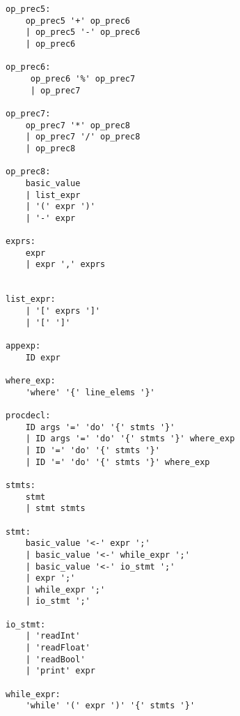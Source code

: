 \documentclass[11pt]{article}
\begin{document}
\begin{lstlisting}[basicstyle=\small]
op_prec5:
    op_prec5 '+' op_prec6
    | op_prec5 '-' op_prec6
    | op_prec6

op_prec6:
     op_prec6 '%' op_prec7
     | op_prec7

op_prec7:
    op_prec7 '*' op_prec8
    | op_prec7 '/' op_prec8
    | op_prec8

op_prec8:
    basic_value
    | list_expr
    | '(' expr ')'
    | '-' expr

exprs:
    expr
    | expr ',' exprs


list_expr:
    | '[' exprs ']'
    | '[' ']'

appexp:
    ID expr

where_exp:
    'where' '{' line_elems '}' 

procdecl:
    ID args '=' 'do' '{' stmts '}'
    | ID args '=' 'do' '{' stmts '}' where_exp
    | ID '=' 'do' '{' stmts '}'
    | ID '=' 'do' '{' stmts '}' where_exp

stmts:
    stmt
    | stmt stmts

stmt:
    basic_value '<-' expr ';'
    | basic_value '<-' while_expr ';'
    | basic_value '<-' io_stmt ';'
    | expr ';'
    | while_expr ';'
    | io_stmt ';'

io_stmt:
    | 'readInt'
    | 'readFloat'
    | 'readBool'
    | 'print' expr

while_expr:
    'while' '(' expr ')' '{' stmts '}' 
\end{lstlisting}
\end{document}
